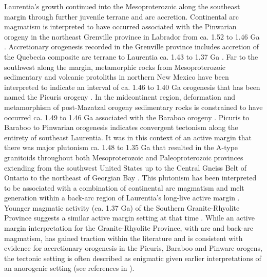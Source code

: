 \documentclass[twocolumn, switch]{article} %
\begin{document}
Laurentia's growth continued into the Mesoproterozoic along the southeast margin through further juvenile terrane and arc accretion. Continental arc magmatism is interpreted to have occurred associated with the Pinwarian orogeny in the northeast Grenville province in Labrador from ca. 1.52 to 1.46 Ga \citep{Gower2002a}. Accretionary orogenesis recorded in the Grenville province includes accretion of the Quebecia composite arc terrane to Laurentia ca. 1.43 to 1.37 Ga \citep{Groulier2020a}. Far to the southwest along the margin, metamorphic rocks from Mesoproterozoic sedimentary and volcanic protoliths in northern New Mexico have been interpreted to indicate an interval of ca. 1.46 to 1.40 Ga orogenesis that has been named the Picuris orogeny \citep{Daniel2013a, Aronoff2016a}. In the midcontinent region,  deformation and metamorphism of post-Mazatzal orogeny sedimentary rocks is constrained to have occurred ca. 1.49 to 1.46 Ga associated with the Baraboo orogeny \citep{Medaris2003a, Holm2019a}. Picuris to Baraboo to Pinwarian orogenesis indicates convergent tectonism along the entirety of southeast Laurentia.  It was in this context of an active margin that there was major plutonism ca. 1.48 to 1.35 Ga that resulted in the A-type granitoids throughout both Mesoproterozoic and Paleoproterozoic provinces extending from the southwest United States up to the Central Gneiss Belt of Ontario to the northeast of Georgian Bay \citep{Slagstad2009a}. This plutonism has been interpreted to be associated with a combination of continental arc magmatism and melt generation within a back-arc region of Laurentia's long-live active margin \citep{Bickford2015a}. Younger magmatic activity (ca. 1.37 Ga) of the Southern Granite-Rhyolite Province suggests a similar active margin setting at that time \citep{Bickford2015a}. While an active margin interpretation for the Granite-Rhyolite Province, with arc and back-arc magmatism, has gained traction within the literature and is consistent with evidence for accretionary orogenesis in the Picuris, Baraboo and Pinware  orogens, the tectonic setting is often described as enigmatic given earlier interpretations of an anorogenic setting (see references in \citealp{Slagstad2009a}).
\end{document}
